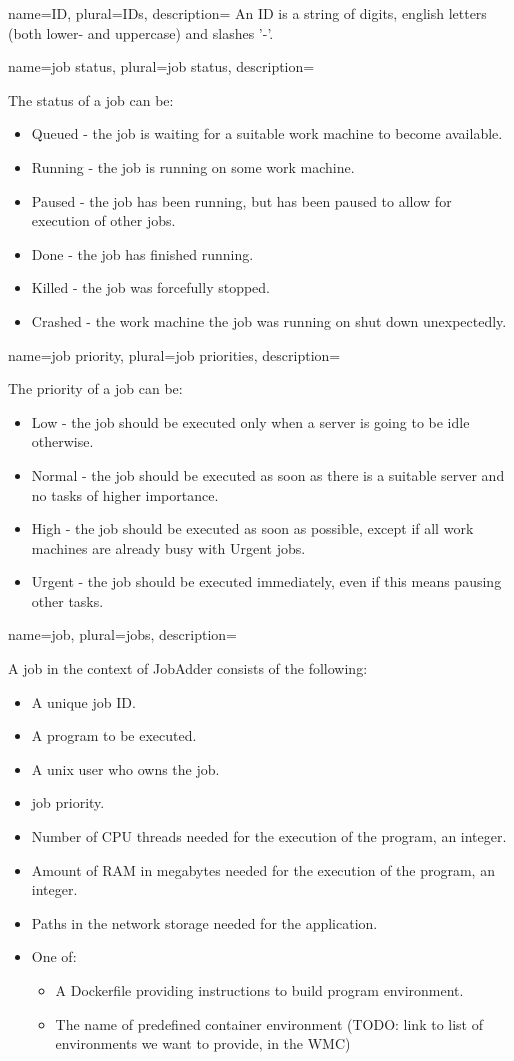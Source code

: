 {
  name=ID,
  plural=IDs,
  description={
    An ID is a string of digits, english letters (both lower- and uppercase) and slashes '-'.
  }
}
{
  name=job status,
  plural=job status,
  description={
    The status of a job can be:
    \begin{itemize}
      \item Queued - the job is waiting for a suitable work machine to become available.
      \item Running - the job is running on some work machine.
      \item Paused - the job has been running, but has been paused to allow for execution of other jobs.
      \item Done - the job has finished running.
      \item Killed - the job was forcefully stopped.
      \item Crashed - the work machine the job was running on shut down unexpectedly.
    \end{itemize}
  }
}
{
  name=job priority,
  plural=job priorities,
  description={
    The priority of a job can be:
    \begin{itemize}
      \item Low - the job should be executed only when a server is going to be idle otherwise.
      \item Normal - the job should be executed as soon as there is a suitable server and no tasks of higher importance.
      \item High - the job should be executed as soon as possible, except if all work machines are already busy with Urgent jobs.
      \item Urgent - the job should be executed immediately, even if this means pausing other tasks.
    \end{itemize}
  }
}
{
  name=job,
  plural=jobs,
  description={
      A job in the context of JobAdder consists of the following:
      \begin{itemize}
        \item A unique job \gls{ID}.
        \item A program to be executed.
        \item A unix user who owns the job.
        \item \Gls{job priority}.
        \item Number of CPU threads needed for the execution of the program, an integer.
        \item Amount of RAM in megabytes needed for the execution of the program, an integer.
        \item Paths in the network storage needed for the application.
        \item One of:
        \begin{itemize}
          \item A Dockerfile providing instructions to build program environment.
          \item The name of predefined container environment (TODO: link to list of environments we want to provide, in the WMC)
        \end{itemize}
     \end{itemize}
  }
}

